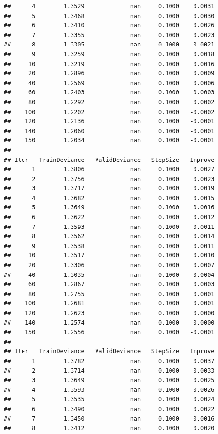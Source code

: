 \documentclass[]{article}
\begin{document}
\begin{verbatim}
##      4        1.3529             nan     0.1000    0.0031
##      5        1.3468             nan     0.1000    0.0030
##      6        1.3410             nan     0.1000    0.0026
##      7        1.3355             nan     0.1000    0.0023
##      8        1.3305             nan     0.1000    0.0021
##      9        1.3259             nan     0.1000    0.0018
##     10        1.3219             nan     0.1000    0.0016
##     20        1.2896             nan     0.1000    0.0009
##     40        1.2569             nan     0.1000    0.0006
##     60        1.2403             nan     0.1000    0.0003
##     80        1.2292             nan     0.1000    0.0002
##    100        1.2202             nan     0.1000   -0.0002
##    120        1.2136             nan     0.1000   -0.0001
##    140        1.2060             nan     0.1000   -0.0001
##    150        1.2034             nan     0.1000   -0.0001
## 
## Iter   TrainDeviance   ValidDeviance   StepSize   Improve
##      1        1.3806             nan     0.1000    0.0027
##      2        1.3756             nan     0.1000    0.0023
##      3        1.3717             nan     0.1000    0.0019
##      4        1.3682             nan     0.1000    0.0015
##      5        1.3649             nan     0.1000    0.0016
##      6        1.3622             nan     0.1000    0.0012
##      7        1.3593             nan     0.1000    0.0011
##      8        1.3562             nan     0.1000    0.0014
##      9        1.3538             nan     0.1000    0.0011
##     10        1.3517             nan     0.1000    0.0010
##     20        1.3306             nan     0.1000    0.0007
##     40        1.3035             nan     0.1000    0.0004
##     60        1.2867             nan     0.1000    0.0003
##     80        1.2755             nan     0.1000    0.0001
##    100        1.2681             nan     0.1000    0.0001
##    120        1.2623             nan     0.1000    0.0000
##    140        1.2574             nan     0.1000    0.0000
##    150        1.2556             nan     0.1000   -0.0001
## 
## Iter   TrainDeviance   ValidDeviance   StepSize   Improve
##      1        1.3782             nan     0.1000    0.0037
##      2        1.3714             nan     0.1000    0.0033
##      3        1.3649             nan     0.1000    0.0025
##      4        1.3593             nan     0.1000    0.0026
##      5        1.3535             nan     0.1000    0.0024
##      6        1.3490             nan     0.1000    0.0022
##      7        1.3450             nan     0.1000    0.0016
##      8        1.3412             nan     0.1000    0.0020

\end{verbatim}
\end{document}
